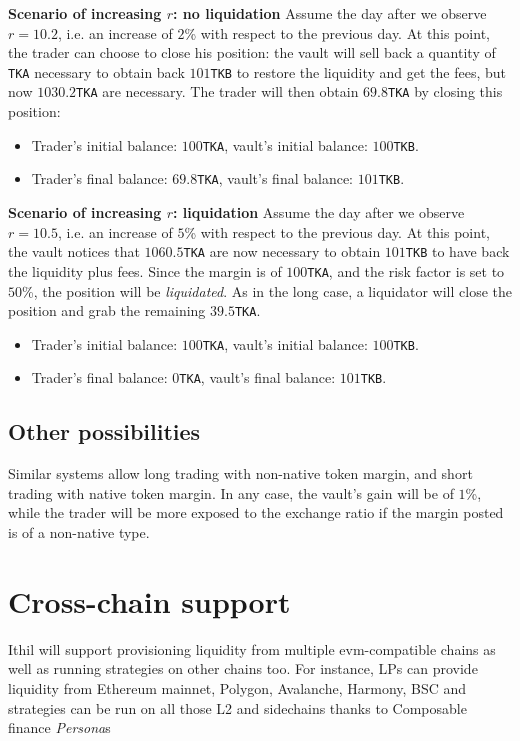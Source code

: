 \documentclass[a4paper,10 pt]{article}
\theoremstyle{definition}
\begin{document}
\textbf{Scenario of increasing $r$: no liquidation}
Assume the day after we observe $r = 10.2$, i.e. an increase of $2$\% with respect to the previous day.  At this point, the trader can choose to close his position: the vault will sell back a quantity of \verb|TKA| necessary to obtain back $101$\verb|TKB| to restore the liquidity and get the fees, but now $1030.2$\verb|TKA| are necessary. The trader will then obtain $69.8$\verb|TKA| by closing this position:
\begin{itemize}
    \item Trader's initial balance: $100$\verb|TKA|, vault's initial balance: $100$\verb|TKB|.
    \item Trader's final balance: $69.8$\verb|TKA|, vault's final balance: $101$\verb|TKB|.
\end{itemize}

\textbf{Scenario of increasing $r$: liquidation}
Assume the day after we observe $r = 10.5$, i.e. an increase of $5$\% with respect to the previous day.  At this point, the vault notices that $1060.5$\verb|TKA| are now necessary to obtain $101$\verb|TKB| to have back the liquidity plus fees. Since the margin is of $100$\verb|TKA|, and the risk factor is set to $50$\%, the position will be \emph{liquidated}. As in the long case, a liquidator will close the position and grab the remaining $39.5$\verb|TKA|.
\begin{itemize}
    \item Trader's initial balance: $100$\verb|TKA|, vault's initial balance: $100$\verb|TKB|.
    \item Trader's final balance: $0$\verb|TKA|, vault's final balance: $101$\verb|TKB|.
\end{itemize}

\subsection{Other possibilities}

Similar systems allow long trading with non-native token margin, and short trading with native token margin. In any case, the vault's gain will be of $1$\%, while the trader will be more exposed to the exchange ratio if the margin posted is of a non-native type.

\section{Cross-chain support}
Ithil will support provisioning liquidity from multiple evm-compatible chains as well as running strategies on other chains too.
For instance, LPs can provide liquidity from Ethereum mainnet, Polygon, Avalanche, Harmony, BSC and strategies can be run on all those L2 and sidechains thanks to Composable finance \textit{Persona}s
\end{document}
